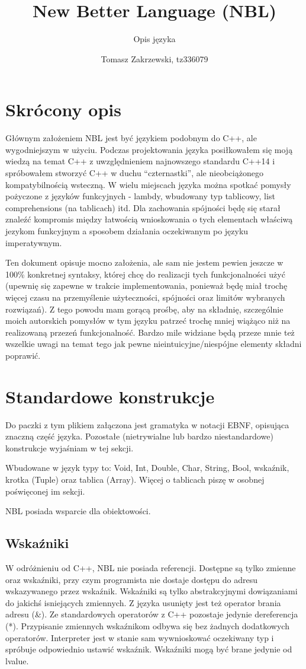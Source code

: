 \documentclass[a4paper,10pt]{scrartcl}
\title{New Better Language (NBL)}
\subtitle{Opis języka}
\author{Tomasz Zakrzewski, tz336079}
\begin{document}
\maketitle

\section{Skrócony opis}
Głównym założeniem NBL jest być językiem podobnym do C++, ale wygodniejszym w użyciu. Podczas projektowania języka posiłkowałem się moją wiedzą
na temat C++ z uwzględnieniem najnowszego standardu C++14 i spróbowałem stworzyć C++ w duchu ``czternastki'', ale nieobciążonego kompatybilnością
wsteczną. W wielu miejscach języka można spotkać pomysły pożyczone z języków funkcyjnych - lambdy, wbudowany typ tablicowy, list comprehensions
(na tablicach) itd. Dla zachowania spójności będę się starał znaleźć kompromis między łatwością wnioskowania o tych elementach właściwą jezykom
funkcyjnym a sposobem działania oczekiwanym po języku imperatywnym.

Ten dokument opisuje mocno założenia, ale sam nie jestem pewien jeszcze w 100\% konkretnej syntaksy, której chcę do realizacji tych funkcjonalności
użyć (upewnię się zapewne w trakcie implementowania, ponieważ będę miał trochę więcej czasu na przemyślenie użyteczności, spójności oraz limitów
wybranych rozwiązań). Z tego powodu mam gorącą prośbę, aby na składnię, szczególnie moich autorskich pomysłów w tym języku patrzeć trochę mniej
wiążąco niż na realizowaną przezeń funkcjonalność. Bardzo mile widziane będą przeze mnie też wszelkie uwagi na temat tego jak pewne 
nieintuicyjne/niespójne elementy składni poprawić.

\section{Standardowe konstrukcje}
Do paczki z tym plikiem załączona jest gramatyka w notacji EBNF, opisująca znaczną część języka. Pozostałe (nietrywialne lub bardzo niestandardowe)
konstrukcje wyjaśniam w tej sekcji.

Wbudowane w język typy to: Void, Int, Double, Char, String, Bool, wskaźnik, krotka (Tuple) oraz tablica (Array). Więcej o tablicach piszę w osobnej poświęconej im sekcji.

NBL posiada wsparcie dla obiektowości.

\subsection{Wskaźniki}
W odróżnieniu od C++, NBL nie posiada referencji. Dostępne są tylko zmienne oraz wskaźniki, przy czym programista nie dostaje dostępu do adresu
wskazywanego przez wskaźnik. Wskaźniki są tylko abstrakcyjnymi dowiązaniami do jakichś isniejących zmiennych. Z języka usunięty jest też operator
brania adresu (\&). Ze standardowych operatorów z C++ pozostaje jedynie dereferencja (*). Przypisanie zmiennych wskaźnikom odbywa się bez żadnych
dodatkowych operatorów. Interpreter jest w stanie sam wywnioskować oczekiwany typ i spróbuje odpowiednio ustawić wskaźnik. Wskaźniki mogą być brane
jedynie od lvalue.
\end{document}
